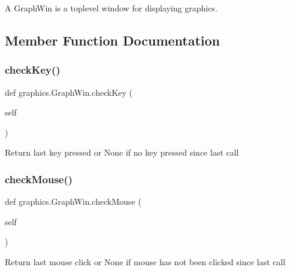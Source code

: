 \begin{DoxyVerb}A GraphWin is a toplevel window for displaying graphics.\end{DoxyVerb}
 

\subsection{Member Function Documentation}
\mbox{\label{classgraphics_1_1_graph_win_a84c703d3a1521fc5edb4fd8af462ebd1}} 
\subsubsection{\texorpdfstring{check\+Key()}{checkKey()}}
{\footnotesize\ttfamily def graphics.\+Graph\+Win.\+check\+Key (\begin{DoxyParamCaption}\item[{}]{self }\end{DoxyParamCaption})}

\begin{DoxyVerb}Return last key pressed or None if no key pressed since last call\end{DoxyVerb}
 \mbox{\label{classgraphics_1_1_graph_win_a47a21f43176302d35e418810c88235ea}} 
\subsubsection{\texorpdfstring{check\+Mouse()}{checkMouse()}}
{\footnotesize\ttfamily def graphics.\+Graph\+Win.\+check\+Mouse (\begin{DoxyParamCaption}\item[{}]{self }\end{DoxyParamCaption})}

\begin{DoxyVerb}Return last mouse click or None if mouse has
not been clicked since last call\end{DoxyVerb}
 \mbox{\label{classgraphics_1_1_graph_win_a760daa823490308117c5ce3ea2946bfb}} 
